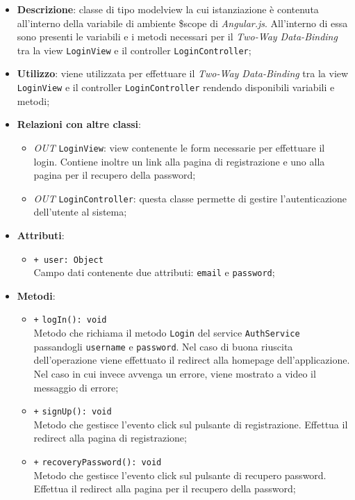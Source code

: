 	\begin{itemize}
		\item \textbf{Descrizione}: classe di tipo modelview la cui istanziazione è contenuta all'interno della variabile di ambiente \$scope di \textit{Angular.js}. All'interno di essa sono presenti le variabili e i metodi necessari per il \textit{Two-Way Data-Binding} tra la view \texttt{LoginView} e il controller \texttt{LoginController};
		\item \textbf{Utilizzo}: viene utilizzata per effettuare il \textit{Two-Way Data-Binding} tra la view \texttt{LoginView} e il controller \texttt{LoginController} rendendo disponibili variabili e metodi;
		\item \textbf{Relazioni con altre classi}: 
		\begin{itemize}
			\item \textit{OUT} \texttt{LoginView}: view contenente le form necessarie per effettuare il login. Contiene inoltre un link alla pagina di registrazione e uno alla pagina per il recupero della password; 
			\item \textit{OUT} \texttt{LoginController}: questa classe permette di gestire l'autenticazione dell'utente al sistema;
		\end{itemize}
		\item \textbf{Attributi}: 
		\begin{itemize}
			\item \texttt{+ user: Object} \\ Campo dati contenente due attributi: \texttt{email} e \texttt{password};
		\end{itemize}
		\item \textbf{Metodi}: 
		\begin{itemize}
			\item \texttt{+} \texttt{logIn(): void} \\
			Metodo che richiama il metodo \texttt{Login} del service \texttt{AuthService} passandogli \texttt{username} e \texttt{password}. Nel caso di buona riuscita dell'operazione viene effettuato il redirect alla homepage dell'applicazione. Nel caso in cui invece avvenga un errore, viene mostrato a video il messaggio di errore;
			\item \texttt{+} \texttt{signUp(): void} \\
			Metodo che gestisce l’evento click sul pulsante di registrazione. Effettua il redirect alla pagina di registrazione;
			\item \texttt{+} \texttt{recoveryPassword(): void} \\
			Metodo che gestisce l’evento click sul pulsante di recupero password. Effettua il redirect alla pagina per il recupero della password; 
		\end{itemize}
	\end{itemize}
	
